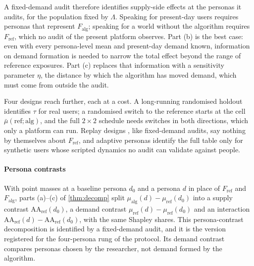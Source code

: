 A fixed-demand audit therefore identifies supply-side effects at the personas it audits, for the population fixed by $\Lambda$. Speaking for present-day users requires personas that represent $F_{\mathrm{alg}}$; speaking for a world without the algorithm requires $F_{\mathrm{ref}}$, which no audit of the present platform observes. Part (b) is the best case: even with every persona-level mean and present-day demand known, information on demand formation is needed to narrow the total effect beyond the range of reference exposures. Part (c) replaces that information with a sensitivity parameter $\eta$, the distance by which the algorithm has moved demand, which must come from outside the audit.

Four designs reach further, each at a cost. A long-running randomised holdout \citep{huszar2022} identifies $\tau$ for real users; a randomised switch to the reference \citep{guess2023} starts at the cell $\bar\mu(\mathrm{ref};\mathrm{alg})$, and the full $2\times2$ schedule needs switches in both directions, which only a platform can run. Replay designs \citep{hosseinmardi2024}, like fixed-demand audits, say nothing by themselves about $F_{\mathrm{ref}}$, and adaptive personas identify the full table only for synthetic users whose scripted dynamics no audit can validate against people.

\paragraph{Persona contrasts} With point masses at a baseline persona $d_0$ and a persona $d$ in place of $F_{\mathrm{ref}}$ and $F_{\mathrm{alg}}$, parts (a)--(c) of \cref{thm:decomp} split $\mu_{\mathrm{alg}}(d)-\mu_{\mathrm{ref}}(d_0)$ into a supply contrast $\mathrm{AA}_{\mathrm{ref}}(d_0)$, a demand contrast $\mu_{\mathrm{ref}}(d)-\mu_{\mathrm{ref}}(d_0)$ and an interaction $\mathrm{AA}_{\mathrm{ref}}(d)-\mathrm{AA}_{\mathrm{ref}}(d_0)$, with the same Shapley shares. This persona-contrast decomposition is identified by a fixed-demand audit, and it is the version registered for the four-persona rung of the protocol. Its demand contrast compares personas chosen by the researcher, not demand formed by the algorithm.
